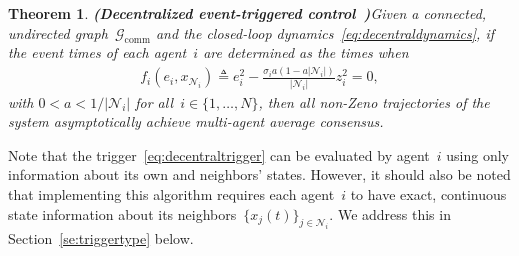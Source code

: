\documentclass{autart}
\newtheorem{theorem}{Theorem}[section]
\newcommand{\GG}{{\mathcal{G}}}
\newcommand{\NN}{{\mathcal{N}}}
\newcommand{\until}[1]{\{1,\dots, #1\}}
\newcommand{\commgraph}{\GG_\text{comm}}
\renewcommand{\hat}{\widehat}
\newcommand{\longthmtitle}[1]{\mbox{}\textup{\textbf{(#1)}}}
\begin{document}
\begin{theorem}\longthmtitle{Decentralized event-triggered
    control~\citep{DVD-EF-KHJ:12}}\label{th:event-control}
  Given {a connected, undirected graph~$\commgraph$ and} the closed-loop
  dynamics~\eqref{eq:decentraldynamics}, if the event times of each
  agent~$i$ are determined as the times when
  \begin{align}\label{eq:decentraltrigger}
    f_i(e_i,x_{\NN_i} ) \triangleq e_i^2 - \frac{
      \sigma_i a (1 - a|\NN_i|)}{|\NN_i|} z_i^2 = 0,
  \end{align}
  with $0 < a < 1/|\NN_i|$ for all~$i \in \until{N}$, then all
  non-Zeno trajectories of the system asymptotically achieve
  multi-agent average consensus.
\end{theorem}

Note that the trigger~\eqref{eq:decentraltrigger} can be evaluated by
agent~$i$ using only information about its own and neighbors' states.
{However, it should also be noted that implementing this algorithm
requires each agent~$i$ to have exact, continuous state information
about its neighbors~$\{x_j(t)\}_{j \in \NN_i}$. We address this in
Section~\ref{se:triggertype} below.}

%
\end{document}
